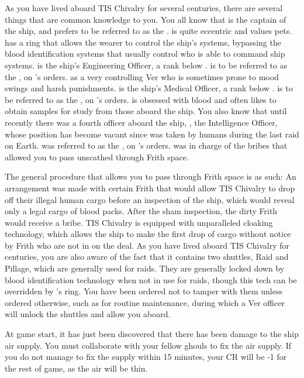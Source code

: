 \documentclass[blue]{guildcamp4}
\begin{document}
As you have lived aboard TIS Chivalry for several centuries, there are several things that are common knowledge to you. You all know that \cVone{} is the captain of the ship, and prefers to be referred to as the \cVone{\Duke}. \cVone{} is quite eccentric and values \cVone{\their} pets. \cVone{} has a ring that allows the wearer to control the ship's systems, bypassing the blood identification systems that usually control who is able to command ship systems. \cVtwo{} is the ship's Engineering Officer, a rank below \cVone{}. \cVtwo{} is to be referred to as the \cVtwo{\Marq}, on \cVone{}'s orders. \cVtwo{} as a very controlling Ver who is sometimes prone to mood swings and harsh punishments. \cVthree{} is the ship's Medical Officer, a rank below \cVtwo{}. \cVthree{} is to be referred to as the \cVthree{\Baron}, on \cVone{}'s orders. \cVthree{} is obsessed with blood and often likes to obtain samples for study from those aboard the ship. You also know that until recently there was a fourth officer aboard the ship, \cIntel{}, the Intelligence Officer, whose position has become vacant since \cIntel{\they} was taken by humans during the last raid on Earth. \cIntel{} was referred to as the \cIntel{\Count}, on \cVone{}'s orders. \cIntel{} was in charge of the bribes that allowed you to pass unscathed through Frith space.

The general procedure that allows you to pass through Frith space is as such: An arrangement was made with certain Frith that would allow TIS Chivalry to drop off their illegal human cargo before an inspection of the ship, which would reveal only a legal cargo of blood packs. After the sham inspection, the dirty Frith would receive a bribe. TIS Chivalry is equipped with unparalleled cloaking technology, which allows the ship to make the first drop of cargo without notice by Frith who are not in on the deal. As you have lived aboard TIS Chivalry for centuries, you are also aware of the fact that it contains two shuttles, Raid and Pillage, which are generally used for raids. They are generally locked down by blood identification technology when not in use for raids, though this tech can be overridden by \cVone{}'s ring. You have been ordered not to tamper with them unless ordered otherwise, such as for routine maintenance, during which a Ver officer will unlock the shuttles and allow you aboard.

At game start, it has just been discovered that there has been damage to the ship air supply. You must collaborate with your fellow ghouls to fix the air supply. If you do not manage to fix the supply within 15 minutes, your CR will be -1 for the rest of game, as the air will be thin.
\end{document}
